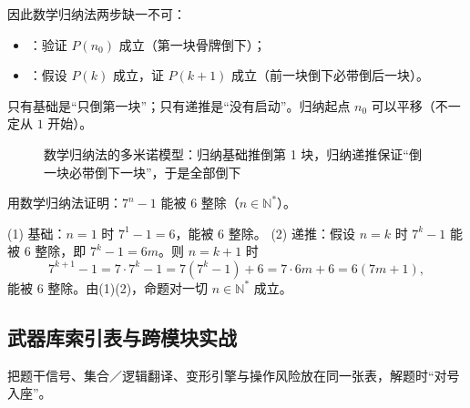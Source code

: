 \begin{explore}
因此数学归纳法两步缺一不可：
\begin{itemize}
  \item {}：验证 $P(n_0)$ 成立（第一块骨牌倒下）；
  \item {}：假设 $P(k)$ 成立，证 $P(k+1)$ 成立（前一块倒下必带倒后一块）。
\end{itemize}
只有基础是“只倒第一块”；只有递推是“没有启动”。归纳起点 $n_0$ 可以平移（不一定从 $1$ 开始）。

\begin{figure}[htbp]
  \centering
  \caption{数学归纳法的多米诺模型：归纳基础推倒第 1 块，归纳递推保证“倒一块必带倒下一块”，于是全部倒下}
  \label{fig:induction}
\end{figure}

\begin{example}
用数学归纳法证明：$7^n-1$ 能被 $6$ 整除（$n\in\mathbb{N}^*$）。
\end{example}
\begin{solution}
(1) 基础：$n=1$ 时 $7^1-1=6$，能被 $6$ 整除。
(2) 递推：假设 $n=k$ 时 $7^k-1$ 能被 $6$ 整除，即 $7^k-1=6m$。则 $n=k+1$ 时
\[
  7^{k+1}-1=7\cdot7^k-1=7(7^k-1)+6=7\cdot6m+6=6(7m+1),
\]
能被 $6$ 整除。由(1)(2)，命题对一切 $n\in\mathbb{N}^*$ 成立。
\end{solution}

\subsection{武器库索引表与跨模块实战}

把题干信号、集合／逻辑翻译、变形引擎与操作风险放在同一张表，解题时“对号入座”。


\end{explore}
